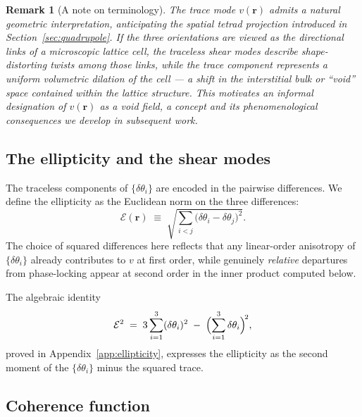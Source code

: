 \documentclass[a4paper,fleqn]{cas-dc}
\theoremstyle{thmstyleone}%
\theoremstyle{thmstyletwo}%
\newtheorem{remark}{Remark}%
\begin{document}
\begin{remark}[A note on terminology]
\label{rem:void_terminology}
The trace mode $v(\mathbf{r})$ admits a natural geometric
interpretation, anticipating the spatial tetrad projection
introduced in Section~\ref{sec:quadrupole}. If the three
orientations are viewed as the directional links of a
microscopic lattice cell, the traceless shear modes describe
shape-distorting twists among those links, while the trace
component represents a uniform volumetric dilation of the
cell — a shift in the interstitial bulk or ``void'' space
contained within the lattice structure. This motivates an
informal designation of $v(\mathbf{r})$ as a \emph{void
field}, a concept and its phenomenological consequences we
develop in subsequent work.
\end{remark}

\subsection{The ellipticity and the shear modes}

The traceless components of $\{\delta\theta_i\}$ are encoded
in the pairwise differences. We define the ellipticity as the
Euclidean norm on the three differences:
\begin{equation}
    \mathcal{E}(\mathbf{r})
    \;\equiv\;
    \sqrt{\sum_{i<j}\bigl(\delta\theta_i-\delta\theta_j\bigr)^2}.
    \label{eq:ellip_def}
\end{equation}
The choice of squared differences here reflects that any
linear-order anisotropy of $\{\delta\theta_i\}$ already
contributes to $v$ at first order, while genuinely
\emph{relative} departures from phase-locking appear at second
order in the inner product computed below.

The algebraic identity
\begin{equation}
    \mathcal{E}^2
    \;=\;
    3\sum_{i=1}^{3}(\delta\theta_i)^2
    \;-\;
    \Bigl(\sum_{i=1}^{3}\delta\theta_i\Bigr)^{\!2},
    \label{eq:ellip_identity}
\end{equation}
proved in Appendix~\ref{app:ellipticity}, expresses the
ellipticity as the second moment of the
$\{\delta\theta_i\}$ minus the squared trace.

\subsection{Coherence function}
\end{document}
